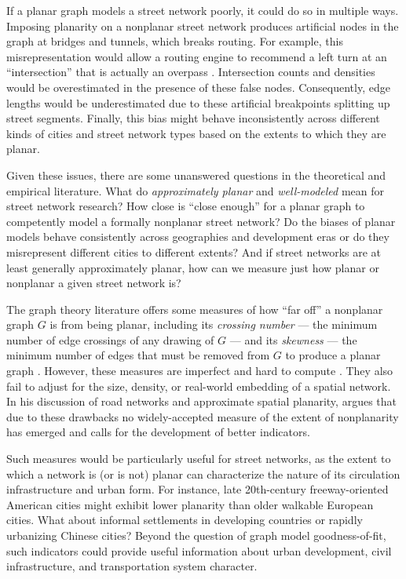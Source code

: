 \documentclass[Afour,sageh,times]{sagej}
\begin{document}
If a planar graph models a street network poorly, it could do so in multiple ways. Imposing planarity on a nonplanar street network produces artificial nodes in the graph at bridges and tunnels, which breaks routing. For example, this misrepresentation would allow a routing engine to recommend a left turn at an \enquote{intersection} that is actually an overpass \citep[p.~6]{kwan_review_1996}. Intersection counts and densities would be overestimated in the presence of these false nodes. Consequently, edge lengths would be underestimated due to these artificial breakpoints splitting up street segments. Finally, this bias might behave inconsistently across different kinds of cities and street network types based on the extents to which they are planar.

Given these issues, there are some unanswered questions in the theoretical and empirical literature. What do \emph{approximately planar} and \emph{well-modeled} mean for street network research? How close is \enquote{close enough} for a planar graph to competently model a formally nonplanar street network? Do the biases of planar models behave consistently across geographies and development eras or do they misrepresent different cities to different extents? And if street networks are at least generally approximately planar, how can we measure just how planar or nonplanar a given street network is?

The graph theory literature offers some measures of how \enquote{far off} a nonplanar graph $G$ is from being planar, including its \emph{crossing number} --- the minimum number of edge crossings of any drawing of $G$ --- and its \emph{skewness} --- the minimum number of edges that must be removed from $G$ to produce a planar graph \citep{liebers_planarizing_2001,chimani_non-planar_2009}. However, these measures are imperfect and hard to compute \citep{szekely_successful_2004,chimani_vertex_2012}. They also fail to adjust for the size, density, or real-world embedding of a spatial network. In his discussion of road networks and approximate spatial planarity, \citet[p.~133]{newman_networks:_2010} argues that due to these drawbacks no widely-accepted measure of the extent of nonplanarity has emerged and calls for the development of better indicators.

Such measures would be particularly useful for street networks, as the extent to which a network is (or is not) planar can characterize the nature of its circulation infrastructure and urban form. For instance, late 20th-century freeway-oriented American cities might exhibit lower planarity than older walkable European cities. What about informal settlements in developing countries or rapidly urbanizing Chinese cities? Beyond the question of graph model goodness-of-fit, such indicators could provide useful information about urban development, civil infrastructure, and transportation system character.
\end{document}
